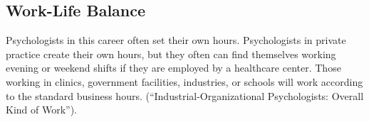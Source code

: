 \begin{multicols}{2}
\section{Work-Life Balance}
Psychologists in this career often set their own hours. Psychologists in private practice create their own hours, but they often can find themselves working evening or weekend shifts if they are employed by a healthcare center. Those working in clinics, government facilities, industries, or schools will work according to the standard business hours. (“Industrial-Organizational Psychologists: Overall Kind of Work”). 
\end{multicols}